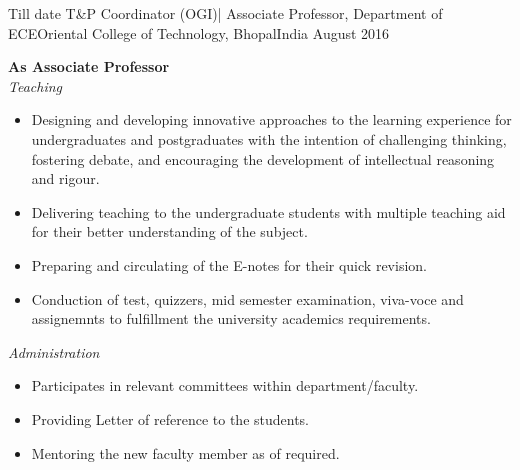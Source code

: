 %
%
%
\begin{experiences}
  \experience
    {Till date}   {T\&P Coordinator (OGI)| Associate Professor,
    	 Department of ECE}{Oriental College of Technology, Bhopal}{India}
    {August 2016} {\textbf{As Associate Professor}\\
    				\textit{Teaching}
                      \begin{itemize}
                        \item Designing and developing innovative approaches to the learning experience for undergraduates and postgraduates with the intention of challenging thinking, fostering debate, and encouraging the development of intellectual reasoning and rigour.                       
                        \item Delivering teaching to the undergraduate students with multiple teaching aid for their better understanding of the subject.                 
                        \item Preparing and circulating of the E-notes for their quick revision.                  
                        \item Conduction of test, quizzers, mid semester examination, viva-voce and assignemnts to fulfillment the university academics requirements.                                                                   
                      \end{itemize}
                
                  		\textit{Administration}
                  		\begin{itemize}
                  			
                  			\item Participates in relevant committees within department/faculty.  
                  			
                   			\item Providing Letter of reference to the students.        
                  			               
                  			\item Mentoring the new faculty member as of required.
                  			

\end{itemize}}
\end{experiences}

